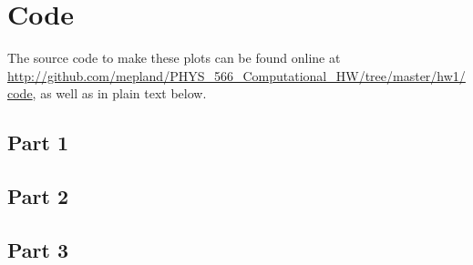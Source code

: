 \documentclass[notitlepage,aps,prd,nofootinbib]{revtex4-1}
\begin{document}
\clearpage
\section{Code}
The source code to make these plots can be found online at \url{http://github.com/mepland/PHYS_566_Computational_HW/tree/master/hw1/code}, as well as in plain text below.


\subsection{Part 1}


\clearpage
\subsection{Part 2}


\clearpage
\subsection{Part 3}



\clearpage

\end{document}

